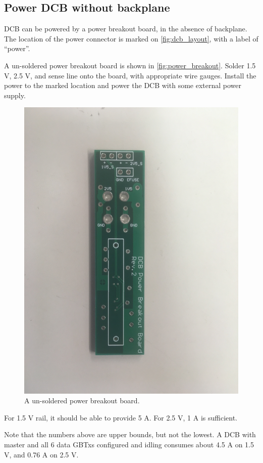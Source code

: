 \subsection{Power DCB without backplane}
DCB can be powered by a power breakout board, in the absence of backplane.
The location of the power connector is marked on \autoref{fig:dcb_layout}, with
a label of ``power''.

A un-soldered power breakout board is shown in \autoref{fig:power_breakout}.
Solder 1.5 V, 2.5 V, and sense line onto the board, with appropriate wire
gauges.
Install the power to the marked location and power the DCB with some external
power supply.

\begin{figure}[!ht]
    \centering
    \includegraphics[width=0.9\linewidth]{res/power_breakout_board.jpg}
    \caption{A un-soldered power breakout board.}
    \label{fig:power_breakout}
\end{figure}

\begin{leftbar}
    For 1.5 V rail, it should be able to provide 5 A.
    For 2.5 V, 1 A is sufficient.

    Note that the numbers above are upper bounds, but not the lowest.
    A DCB with master and all 6 data GBTxs configured and idling consumes about
    4.5 A on 1.5 V, and 0.76 A on 2.5 V.
\end{leftbar}
